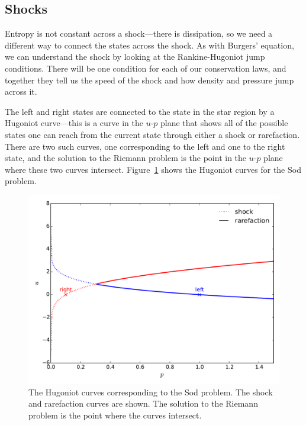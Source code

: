 \subsection{Shocks}

Entropy is not constant across a shock---there is dissipation, so we
need a different way to connect the states across the shock.  As with
Burgers' equation, we can understand the shock by looking at the
Rankine-Hugoniot jump conditions.  There will be one condition for
each of our conservation laws, and together they tell us the speed of
the shock and how density and pressure jump across
it.  

The left and right states are connected to the state in the star
region by a Hugoniot curve---this is a curve in the $u$-$p$ plane that
shows all of the possible states one can reach from the current state
through either a shock or rarefaction.  There are two such curves, one
corresponding to the left and one to the right state, and the solution
to the Riemann problem is the point in the $u$-$p$ plane where these
two curves intersect.  Figure~\ref{fig:euler:riemann-curve} shows the
Hugoniot curves for the Sod problem.

\begin{figure}[t]
\centering
\includegraphics[width=0.9\linewidth]{riemann-phase}
\caption[The Hugoniot curves corresponding
to the Sod problem]{\label{fig:euler:riemann-curve} The Hugoniot
curves corresponding to the Sod problem.  The shock and rarefaction
curves are shown.  The solution to the Riemann problem is the point
where the curves intersect.\\
}
\end{figure}


